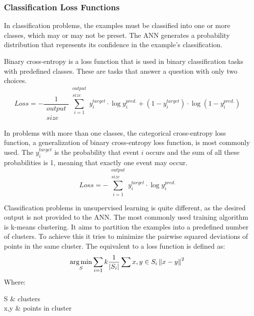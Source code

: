 \subsubsection{Classification Loss Functions}
In classification problems, the examples must be classified into one or more classes, which may or may not be preset. The ANN generates a probability distribution that represents its confidence in the example's classification.

Binary cross-entropy is a loss function that is used in binary classification tasks with predefined classes. These are tasks that answer a question with only two choices.
\begin{equation}
    	Loss = - 
    	\frac{1}{ \substack{ output\\ size } }
    	\sum_{i=1}^{ \substack{ output\\ size } }
    	y_i^{target} \cdot \log y_i^{pred.} + 
    	\left( 1 - y_i^{target} \right) \cdot
    	\log \left( 1 - y_i^{pred.} \right)
    	\label{eqn:Binary cross-entropy}
\end{equation}

In problems with more than one classes, the categorical cross-entropy loss function, a generalization of binary cross-entropy loss function, is most commonly used. The \( y_i^{target}\) is the probability that event \( i \) occurs and the sum of all these probabilities is 1, meaning that exactly one event may occur.
\begin{equation}
    	Loss = 
    	- \sum_{i=1}^{ \substack{ output\\ size } }
    	y_i^{target} \cdot \log y_i^{pred.}
    	\label{eqn:Categorical cross-entropy}
\end{equation}

Classification problems in unsupervised learning is quite different, as the desired output is not provided to the ANN. The most commonly used training algorithm is k-means clustering. It aims to partition the examples into a predefined number of clusters. To achieve this it tries to minimize the pairwise squared deviations of points in the same cluster. The equivalent to a loss function is defined as:
\begin{equation}
	\operatorname*{arg\,min}_S \sum_{i=1}{k} \frac{1}{ \left| S_i \right| } \sum_{}{x,y \in S_i} \left\| x-y \right\|^2
	\label{eqn:k-means error}
\end{equation}
Where:
\begin{conditions}
    S & clusters\\
    x,y & points in cluster\\
\end{conditions}

